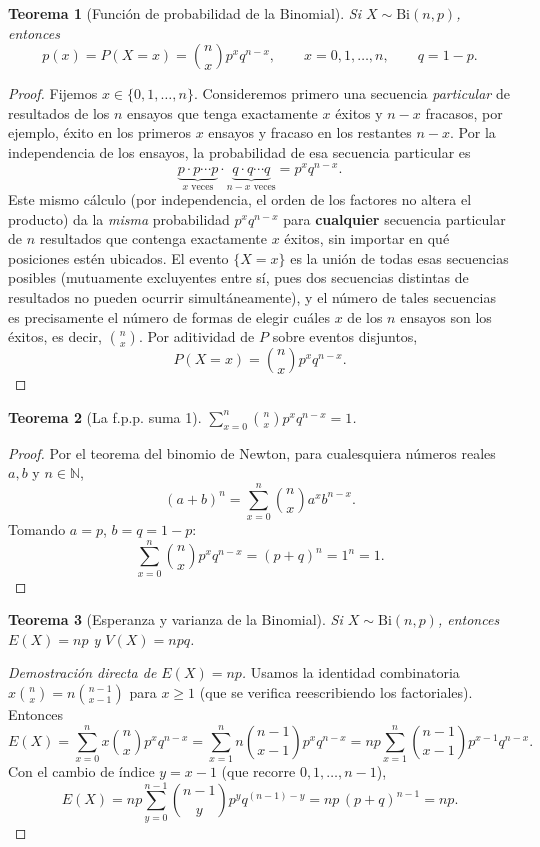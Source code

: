 \documentclass[11pt,a4paper]{article}
\theoremstyle{plain}
\newtheorem{teorema}{Teorema}[section]
\theoremstyle{definition}
\theoremstyle{remark}
\begin{document}
\begin{teorema}[Función de probabilidad de la Binomial]\label{thm:binomial}
Si $X\sim\text{Bi}(n,p)$, entonces
$$p(x)=P(X=x)=\binom{n}{x}p^xq^{n-x},\qquad x=0,1,\dots,n,\qquad q=1-p.$$
\end{teorema}

\begin{proof}
Fijemos $x\in\{0,1,\dots,n\}$. Consideremos primero una secuencia \emph{particular} de resultados de los $n$ ensayos que tenga exactamente $x$ éxitos y $n-x$ fracasos, por ejemplo, éxito en los primeros $x$ ensayos y fracaso en los restantes $n-x$. Por la independencia de los ensayos, la probabilidad de esa secuencia particular es
$$\underbrace{p\cdot p\cdots p}_{x\text{ veces}}\cdot\underbrace{q\cdot q\cdots q}_{n-x\text{ veces}}=p^xq^{n-x}.$$
Este mismo cálculo (por independencia, el orden de los factores no altera el producto) da la \emph{misma} probabilidad $p^xq^{n-x}$ para \textbf{cualquier} secuencia particular de $n$ resultados que contenga exactamente $x$ éxitos, sin importar en qué posiciones estén ubicados. El evento $\{X=x\}$ es la unión de todas esas secuencias posibles (mutuamente excluyentes entre sí, pues dos secuencias distintas de resultados no pueden ocurrir simultáneamente), y el número de tales secuencias es precisamente el número de formas de elegir cuáles $x$ de los $n$ ensayos son los éxitos, es decir, $\binom{n}{x}$. Por aditividad de $P$ sobre eventos disjuntos,
$$P(X=x)=\binom{n}{x}p^xq^{n-x}.$$
\end{proof}

\begin{teorema}[La f.p.p. suma 1]
$\displaystyle\sum_{x=0}^n\binom{n}{x}p^xq^{n-x}=1$.
\end{teorema}
\begin{proof}
Por el teorema del binomio de Newton, para cualesquiera números reales $a,b$ y $n\in\mathbb{N}$,
$$(a+b)^n=\sum_{x=0}^n\binom{n}{x}a^xb^{n-x}.$$
Tomando $a=p$, $b=q=1-p$:
$$\sum_{x=0}^n\binom{n}{x}p^xq^{n-x}=(p+q)^n=1^n=1.$$
\end{proof}

\begin{teorema}[Esperanza y varianza de la Binomial]\label{thm:binomEV}
Si $X\sim\text{Bi}(n,p)$, entonces $E(X)=np$ y $V(X)=npq$.
\end{teorema}

\begin{proof}[Demostración directa de $E(X)=np$]
Usamos la identidad combinatoria $x\binom{n}{x}=n\binom{n-1}{x-1}$ para $x\ge1$ (que se verifica reescribiendo los factoriales). Entonces
$$E(X)=\sum_{x=0}^n x\binom{n}{x}p^xq^{n-x}=\sum_{x=1}^n n\binom{n-1}{x-1}p^xq^{n-x}=np\sum_{x=1}^n\binom{n-1}{x-1}p^{x-1}q^{n-x}.$$
Con el cambio de índice $y=x-1$ (que recorre $0,1,\dots,n-1$),
$$E(X)=np\sum_{y=0}^{n-1}\binom{n-1}{y}p^yq^{(n-1)-y}=np\,(p+q)^{n-1}=np.$$
\end{proof}
\end{document}
